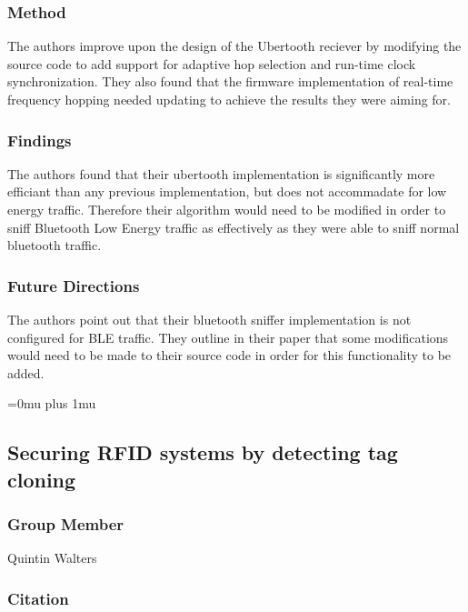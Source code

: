 \subsubsection{Method}

\noindent
The authors improve upon the design of the Ubertooth reciever by modifying the source code to add support for adaptive hop selection and run-time clock synchronization. They also found that the firmware implementation of real-time frequency hopping needed updating to achieve the results they were aiming for.

\subsubsection{Findings}

\noindent
The authors found that their ubertooth implementation is significantly more efficiant than any previous implementation, but does not accommadate for low energy traffic. Therefore their algorithm would need to be modified in order to sniff Bluetooth Low Energy traffic as effectively as they were able to sniff normal bluetooth traffic.

\subsubsection{Future Directions}

\noindent
The authors point out that their bluetooth sniffer implementation is not configured for BLE traffic. They outline in their paper that some modifications would need to be made to their source code in order for this functionality to be added.

\Urlmuskip=0mu plus 1mu\relax

\noindent
\subsection{Securing RFID systems by detecting tag cloning}

\subsubsection{Group Member}

\noindent
Quintin Walters

\noindent
\subsubsection{Citation}

